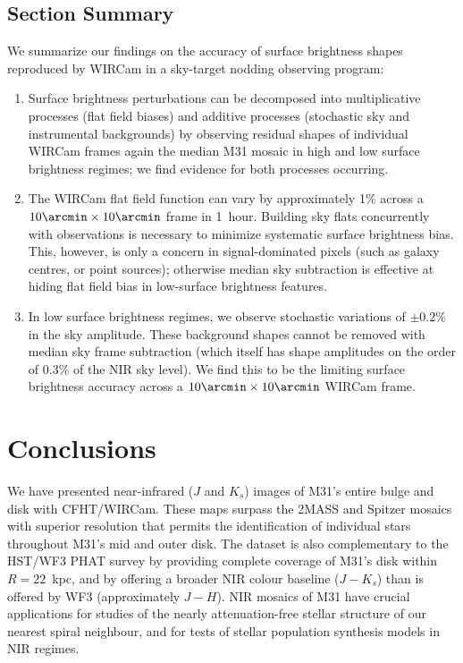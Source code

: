 \documentclass[iop]{emulateapj}
\begin{document}
\subsection{Section Summary}
\label{sec:shapeconclusions}

We summarize our findings on the accuracy of surface brightness shapes reproduced by WIRCam in a sky-target nodding observing program:

\begin{enumerate}
  \item Surface brightness perturbations can be decomposed into multiplicative processes (flat field biases) and additive processes (stochastic sky and instrumental backgrounds) by observing residual shapes of individual WIRCam frames again the median M31 mosaic in high and low surface brightness regimes; we find evidence for both processes occurring.
  \item The WIRCam flat field function can vary by approximately 1\% across a $10\arcmin \times 10\arcmin$ frame in 1~hour. Building sky flats concurrently with observations is necessary to minimize systematic surface brightness bias. This, however, is only a concern in signal-dominated pixels (such as galaxy centres, or point sources); otherwise median sky subtraction is effective at hiding flat field bias in low-surface brightness features.
  \item In low surface brightness regimes, we observe stochastic variations of $\pm 0.2$\% in the sky amplitude. These background shapes cannot be removed with median sky frame subtraction (which itself has shape amplitudes on the order of $0.3\%$ of the NIR sky level). We find this to be the limiting surface brightness accuracy across a $10\arcmin \times 10\arcmin$ WIRCam frame.
\end{enumerate}

\section{Conclusions}
\label{sec:conclusions}

We have presented near-infrared ($J$ and $K_s$) images of M31's entire bulge and disk with CFHT/WIRCam.
These maps surpass the 2MASS \citep{Beaton:2007} and Spitzer \citep{Barmby:2006} mosaics with superior resolution that permits the identification of individual stars throughout M31's mid and outer disk.
The dataset is also complementary to the HST/WF3 PHAT survey \citep{Dalcanton:2012} by providing complete coverage of M31's disk within $R=22$~kpc, and by offering a broader NIR colour baseline ($J-K_s$) than is offered by WF3 (approximately $J-H$).
NIR mosaics of M31 have crucial applications for studies of the nearly attenuation-free stellar structure of our nearest spiral neighbour, and for tests of stellar population synthesis models in NIR regimes.
\end{document}
